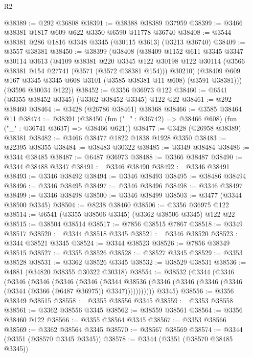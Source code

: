 \begin{lexlean}{R2}
\begin{coremodule}
@38389 := @292 @36808
@38391 := @38388 @38389 @37959
@38399 := @3466 @38381 @1817 @609 @622 @3350 @6590 @11778 @36740
@38408 := @3544 @38381 @286 @1816 @3348 @3345 (@30115 @3613) (@3213 @36740)
@38409 := @3557 @38381
@38450 := @38399
    (@38408
      (@38409
        @1152
        @611
        @3345
        @3347
        @30114
        @3613
        (@4109
          @38381
          @220
          @3345
          @122
          @30198
          @122
          @30114
          (@3566 @38381 @154 @27741 (@3571 (@3572 @38381 @154)))
          @30210)
        (@38409 @609 @167 @3345 @3345 @608 @3101 (@3585 @38381 @11 @608) (@3591 @38381)))
      (@3596 @30034 @122))
@38452 := @3356 @36973 @122
@38460 := @6541 (@3355 @38452 @3345) (@3362 @38452 @3345) @122 @22
@38461 := @292 @38460
@38464 := @3428 (@26786 @38461) @38368
@38466 := @3585 @38464 @11
@38474 := @38391
    (@38450 (fun ("_" : @36742) => @38466 @608) (fun ("_" : @36741 @3637) => @38466 @621))
@38477 := @3428 (@26958 @38389) @38381
@38482 := @3466 @38477 @1822 @1838 @1928 @3350
@38483 := @22395 @38355
@38484 := @38483 @30322
@38485 := @3349 @38484
@38486 := @3344 @38485
@38487 := @6487 @36973
@38488 := @3366 @38487
@38490 := @3344 @38488 @3347
@38491 := @3346 @38490
@38492 := @3346 @38491
@38493 := @3346 @38492
@38494 := @3346 @38493
@38495 := @38486 @38494
@38496 := @3346 @38495
@38497 := @3346 @38496
@38498 := @3346 @38497
@38499 := @3346 @38498
@38500 := @3346 @38499
@38503 := @3477 (@3344 @38500 @3345)
@38504 := @8238 @38460
@38506 := @3356 @36975 @122
@38514 := @6541 (@3355 @38506 @3345) (@3362 @38506 @3345) @122 @22
@38515 := @38504 @38514
@38517 := @7856 @38515 @7867
@38518 := @3349 @38517
@38520 := @3344 @38518 @3345
@38521 := @3346 @38520
@38523 := @3344 @38521 @3345
@38524 := @3344 @38523
@38526 := @7856 @38349 @38515
@38527 := @3355 @38526
@38528 := @38527 @3345
@38529 := @3353 @38528
@38531 := @3362 @38526 @3345
@38532 := @38529 @38531
@38536 := @4881 (@34820 @38355 @30322 @30318)
@38554 := @38532
    (@3344
      (@3346
        (@3346
          (@3346
            (@3346
              (@3346
                (@3344
                  @38536
                  (@3346 (@3346 (@3346 (@3346 (@3344 (@3366 (@6487 @36975)) @3347)))))))))))
      @3345)
@38556 := @3356 @38349 @38515
@38558 := @3355 @38556 @3345
@38559 := @3353 @38558
@38561 := @3362 @38556 @3345
@38562 := @38559 @38561
@38564 := @3356 @38460 @122
@38566 := @3355 @38564 @3345
@38567 := @3353 @38566
@38569 := @3362 @38564 @3345
@38570 := @38567 @38569
@38574 := @3344 (@3351 (@38570 @3345 @3345))
@38578 := @3344 (@3351 (@38570 @38485 @3345))

\end{coremodule}
\end{lexlean}
